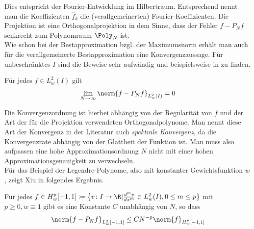 Dies entspricht der Fourier-Entwicklung im Hilbertraum. Entsprechend nennt man die Koeffizienten $\hat{f}_k$ die (verallgemeinerten) Fourier-Koeffizienten. Die Projektion ist eine Orthogonalprojektion in dem Sinne, dass der Fehler $f-P_Nf$ senkrecht zum Polynomraum $\Poly_N$ ist.\\
Wie schon bei der Bestapproximation bzgl. der Maximumsnorm erhält man auch für die verallgemeinerte Bestapproximation eine Konvergenzaussage. Für unbeschränktes $I$ sind die Beweise sehr aufwändig und beispielsweise in \autocite{CouHil53} zu finden. 
\begin{maththeorem}
Für jedes $f\in L_w^2(I)$ gilt
\[\lim\limits_{N\to\infty}\norm{f-P_Nf}_{L_w^2(I)}=0\]
\end{maththeorem}
Die Konvergenzordnung ist hierbei abhängig von der Regularität von $f$ und der Art der für die Projektion verwendeten Orthogonalpolynome. Man nennt diese Art der Konvergenz in der Literatur auch \emph{spektrale Konvergenz}, da die Konvergenzrate abhängig von der Glattheit der Funktion ist. Man muss also aufpassen eine hohe Approximationsordnung $N$ nicht mit einer hohen Approximationsgenauigkeit zu verwechseln.\\
Für das Beispiel der Legendre-Polynome, also mit konstanter Gewichtsfunktion $w$, zeigt Xiu in \autocite[Theorem 3.6]{dongbinxiu2010} folgendes Ergebnis.
\begin{maththeorem}
\label{spectralconvth}
Für jedes $f\in H_w^p[-1,1]\coloneqq \left\lbrace v\colon I\to\R | \frac{d^mv}{dx^m}\in L_w^2(I),0\le m\le p\right\rbrace$ mit $p\ge 0, w\equiv 1$ gibt es eine Konstante $C$ unabhängig von $N$, so dass
\[\norm{f-P_Nf}_{L_w^2[-1,1]}\le CN^{-p}\norm{f}_{H_w^p[-1,1]}\]
\end{maththeorem}

